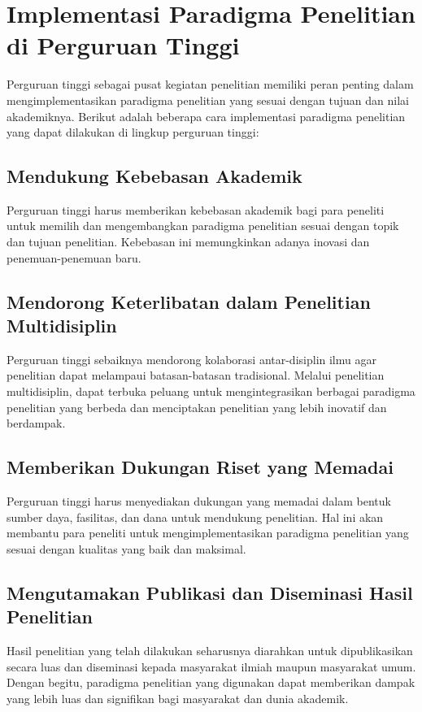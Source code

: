 \section{Implementasi Paradigma Penelitian di Perguruan Tinggi}
Perguruan tinggi sebagai pusat kegiatan penelitian memiliki peran penting dalam mengimplementasikan paradigma penelitian yang sesuai dengan tujuan dan nilai akademiknya. Berikut adalah beberapa cara implementasi paradigma penelitian yang dapat dilakukan di lingkup perguruan tinggi:

\subsection{Mendukung Kebebasan Akademik}
Perguruan tinggi harus memberikan kebebasan akademik bagi para peneliti untuk memilih dan mengembangkan paradigma penelitian sesuai dengan topik dan tujuan penelitian. Kebebasan ini memungkinkan adanya inovasi dan penemuan-penemuan baru.

\subsection{Mendorong Keterlibatan dalam Penelitian Multidisiplin}
Perguruan tinggi sebaiknya mendorong kolaborasi antar-disiplin ilmu agar penelitian dapat melampaui batasan-batasan tradisional. Melalui penelitian multidisiplin, dapat terbuka peluang untuk mengintegrasikan berbagai paradigma penelitian yang berbeda dan menciptakan penelitian yang lebih inovatif dan berdampak.

\subsection{Memberikan Dukungan Riset yang Memadai}
Perguruan tinggi harus menyediakan dukungan yang memadai dalam bentuk sumber daya, fasilitas, dan dana untuk mendukung penelitian. Hal ini akan membantu para peneliti untuk mengimplementasikan paradigma penelitian yang sesuai dengan kualitas yang baik dan maksimal.

\subsection{Mengutamakan Publikasi dan Diseminasi Hasil Penelitian}
Hasil penelitian yang telah dilakukan seharusnya diarahkan untuk dipublikasikan secara luas dan diseminasi kepada masyarakat ilmiah maupun masyarakat umum. Dengan begitu, paradigma penelitian yang digunakan dapat memberikan dampak yang lebih luas dan signifikan bagi masyarakat dan dunia akademik.
